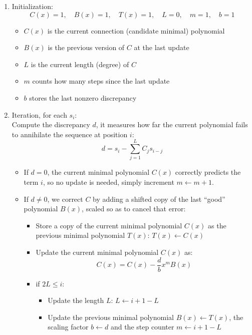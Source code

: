 \documentclass[a4paper, 11pt]{article}
\begin{document}
\begin{enumerate}
    \item Initialization:
    $$C(x)=1, \quad B(x) = 1, \quad T(x) = 1, \quad L = 0, \quad m = 1, \quad b = 1$$
    \begin{itemize}
        \item $C(x)$ is the current connection (candidate minimal) polynomial
        \item $B(x)$ is the previous version of $C$ at the last update
        \item $L$ is the current length (degree) of $C$
        \item $m$ counts how many steps since the last update
        \item $b$ stores the last nonzero discrepancy
    \end{itemize}
    \item Iteration, for each $s_i$: \\
    Compute the discrepancy $d$, it measures how far the current polynomial fails to annihilate the sequence at position $i$:
        $$d = s_i - \sum^L_{j=1}C_j s_{i-j}$$
    \begin{itemize}
        \item If $d=0$, the current minimal polynomial $C(x)$ correctly predicts the term $i$, so no update is needed, simply increment $m \leftarrow m + 1$.
        \item If $d \neq 0$, we correct $C$ by adding a shifted copy of the last “good” polynomial $B(x)$, scaled so as to cancel that error:
        \begin{itemize}
            \item Store a copy of the current minimal polynomial $C(x)$ as the previous minimal polynomial $T(x)$: $T(x) \leftarrow C(x)$
            \item Update the current minimal polynomial $C(x)$ as: $$C(x)=C(x)-\frac{d}{b}x^mB(x)$$
            \item if $2L \leq i$:
            \begin{itemize}
                \item Update the length $L$: $L\leftarrow i+1-L$
                \item Update the previous minimal polynomial $B(x) \leftarrow T(x)$, the scaling factor $b \leftarrow d$ and the step counter $m \leftarrow i + 1 - L$
            \end{itemize}
        \end{itemize}
    \end{itemize}
\end{enumerate}
\end{document}
